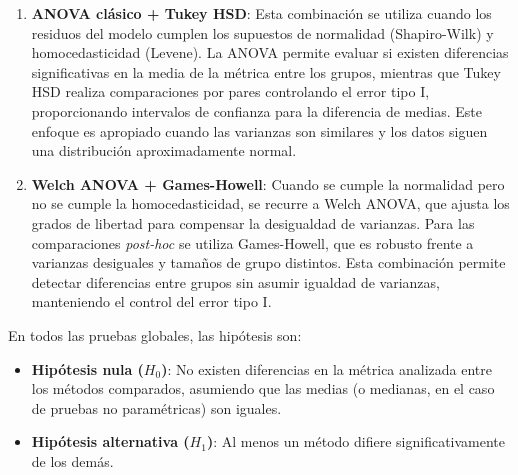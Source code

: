 \begin{enumerate}

    \item \textbf{ANOVA clásico + Tukey HSD}: Esta combinación se utiliza cuando los residuos del modelo cumplen los supuestos de normalidad (Shapiro-Wilk) y homocedasticidad (Levene). La ANOVA permite evaluar si existen diferencias significativas en la media de la métrica entre los grupos, mientras que Tukey HSD realiza comparaciones por pares controlando el error tipo I, proporcionando intervalos de confianza para la diferencia de medias. Este enfoque es apropiado cuando las varianzas son similares y los datos siguen una distribución aproximadamente normal.
    
    \item \textbf{Welch ANOVA + Games-Howell}: Cuando se cumple la normalidad pero no se cumple la homocedasticidad, se recurre a Welch ANOVA, que ajusta los grados de libertad para compensar la desigualdad de varianzas. Para las comparaciones \textit{post-hoc} se utiliza Games-Howell, que es robusto frente a varianzas desiguales y tamaños de grupo distintos. Esta combinación permite detectar diferencias entre grupos sin asumir igualdad de varianzas, manteniendo el control del error tipo I.
    
    
\end{enumerate}

En todos las pruebas globales, las hipótesis son:

\begin{itemize}
    \item \textbf{Hipótesis nula ($H_0$)}: No existen diferencias en la métrica analizada entre los métodos comparados, asumiendo que las medias (o medianas, en el caso de pruebas no paramétricas) son iguales.
    \item \textbf{Hipótesis alternativa ($H_1$)}: Al menos un método difiere significativamente de los demás.
\end{itemize}


